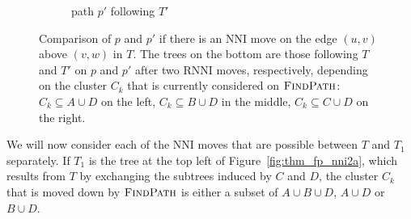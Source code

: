 \documentclass{amsart}
\newcommand{\rnni}{\mathrm{RNNI}}
\newcommand{\findpath}{\textsc{FindPath}}
\newcommand{\nni}{\mathrm{NNI}}
\begin{document}
\begin{enumerate}[{Case} (1).]
\begin{figure}[H]
\begin{subfigure}[b]{.45\textwidth}
		\vspace{12pt}
		\caption{path $p'$ following $T'$}
		\label{fig:thm_fp_nni2b}
	\end{subfigure}
	\caption{Comparison of $p$ and $p'$ if there is an $\nni$ move on the edge $(u,v)$ above $(v,w)$ in $T$.
	The trees on the bottom are those following $T$ and $T'$ on $p$ and $p'$ after two $\rnni$ moves, respectively, depending on the cluster $C_k$ that is currently considered on $\findpath$:
	${C_k \subseteq A \cup D}$ on the left, ${C_k \subseteq B \cup D}$ in the middle, ${C_k \subseteq C \cup D}$ on the right.}
\end{figure}

We will now consider each of the $\nni$ moves that are possible between $T$ and $T_1$ separately.
If $T_1$ is the tree at the top left of Figure~\ref{fig:thm_fp_nni2a}, which results from $T$ by exchanging the subtrees induced by $C$ and $D$, the cluster $C_k$ that is moved down by $\findpath$ is either a subset of $A \cup B \cup D$, $A \cup D$ or $B \cup D$.


\end{enumerate}
\end{document}
